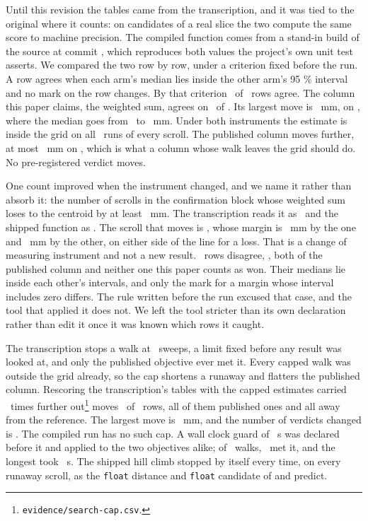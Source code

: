 Until this revision the tables came from the transcription, and it was tied to the original where
it counts: on candidates of a real slice the two compute the same score to machine precision. The
compiled function comes from a stand-in build of the source at commit \texttt{\RevVillaShort},
which reproduces both values the project's own unit test asserts. We compared the two row by row,
under a criterion fixed before the run. A row agrees when each arm's median lies inside the other
arm's 95 \% interval and no mark on the row changes. By that criterion \RevCppRowsAgree\ of
\RevCppRowsTotal\ rows agree. The column this paper claims, the weighted sum, agrees on
\RevCppSumRowsAgree\ of \RevCppSumRowsTotal. Its largest move is \RevCppSumWorstMove~mm, on
\RevCppSumWorstScroll, where the median goes from \RevCppSumWorstFrom\ to \RevCppSumWorstTo~mm.
Under both instruments the estimate is inside the grid on all \RevKInsideOf\ runs of every scroll.
The published column moves further, at most \RevCppAsIsWorstMove~mm on \RevCppAsIsWorstScroll,
which is what a column whose walk leaves the grid should do. No pre-registered verdict moves.

One count improved when the instrument changed, and we name it rather than absorb it: the number
of scrolls in the confirmation block whose weighted sum loses to the centroid by at least
\UmbThresholdMm~mm. The transcription reads it as \RevCppLosesTranscription\ and the shipped
function as \RevCppLosesShipped. The scroll that moves is \RevCppLosesScroll, whose margin is
\RevCppLosesFrom~mm by the one and \RevCppLosesTo~mm by the other, on either side of the line for a
loss. That is a change of measuring instrument and not a new result. \RevCppFlagRows\ rows
disagree, \RevCppFlagScrolls, both of the published column and neither one this paper counts as
won. Their medians lie inside each other's intervals, and only the mark for a margin whose interval
includes zero differs. The rule written before the run excused that case, and the tool that applied
it does not. We left the tool stricter than its own declaration rather than edit it once it was
known which rows it caught.

The transcription stops a walk at \RevCapSweeps\ sweeps, a limit fixed before any result was looked
at, and only the published objective ever met it. Every capped walk was outside the grid already,
so the cap shortens a runaway and flatters the published column. Rescoring the transcription's
tables with the capped estimates carried \RevCapFactor\ times further
out\footnote{\texttt{evidence/search-cap.csv}.} moves \RevCapRowsMoved\ of \RevCapRowsTotal\ rows,
all of them published ones and all away from the reference. The largest move is
\RevCapWorstMove~mm, and the number of verdicts changed is \RevCapVerdictsChanged. The compiled run
has no such cap. A wall clock guard of \RevCppGuardSeconds~s was declared before it and applied to
the two objectives alike; of \RevCppEstimates\ walks, \RevCppGuardHits\ met it, and the longest took
\RevCppWorstSeconds~s. The shipped hill climb stopped by itself every time, on every runaway scroll,
as the \texttt{float} distance and \texttt{float} candidate of  and 
predict.

